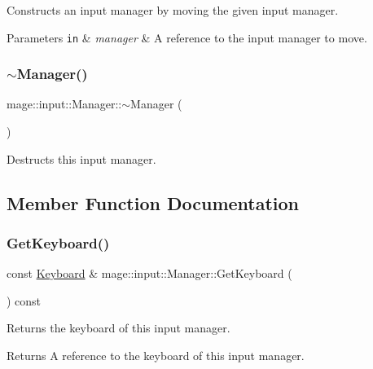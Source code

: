 Constructs an input manager by moving the given input manager.


\begin{DoxyParams}[1]{Parameters}
\mbox{\tt in}  & {\em manager} & A reference to the input manager to move. \\
\hline
\end{DoxyParams}
\mbox{\label{classmage_1_1input_1_1_manager_a2fa35df15cecee8c6842e97912f80edd}} 
\subsubsection{\texorpdfstring{$\sim$\+Manager()}{~Manager()}}
{\footnotesize\ttfamily mage\+::input\+::\+Manager\+::$\sim$\+Manager (\begin{DoxyParamCaption}{ }\end{DoxyParamCaption})\hspace{0.3cm}{\ttfamily [default]}}

Destructs this input manager. 

\subsection{Member Function Documentation}
\mbox{\label{classmage_1_1input_1_1_manager_abd444400d2540d8cb4615cc7c47a72dd}} 
\subsubsection{\texorpdfstring{Get\+Keyboard()}{GetKeyboard()}}
{\footnotesize\ttfamily const \mbox{\hyperlink{classmage_1_1input_1_1_keyboard}{Keyboard}} \& mage\+::input\+::\+Manager\+::\+Get\+Keyboard (\begin{DoxyParamCaption}{ }\end{DoxyParamCaption}) const\hspace{0.3cm}{\ttfamily [noexcept]}}

Returns the keyboard of this input manager.

\begin{DoxyReturn}{Returns}
A reference to the keyboard of this input manager. 
\end{DoxyReturn}
\mbox{\label{classmage_1_1input_1_1_manager_a30cc36d7250842522b34a76e3f785f8a}} 
